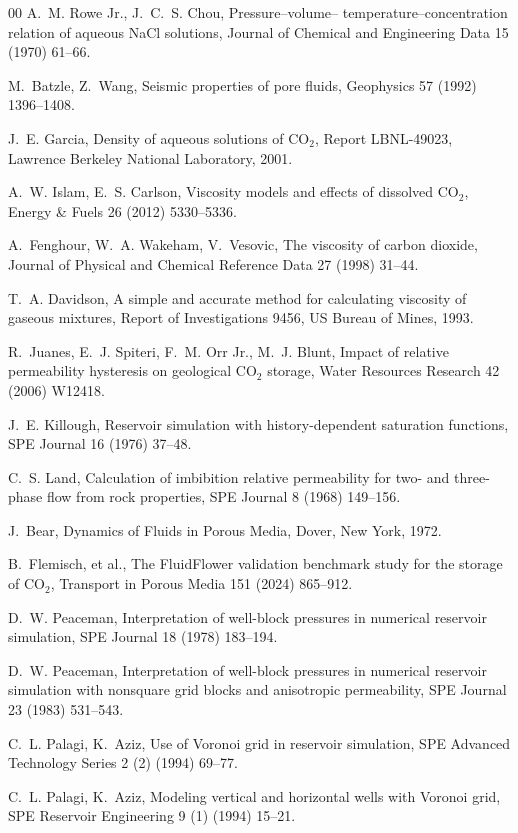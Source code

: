 \documentclass[preprint,11pt]{elsarticle}
\begin{document}
\begin{thebibliography}{00}
 A.~M. Rowe Jr., J.~C.~S. Chou, Pressure--volume--
temperature--concentration relation of aqueous NaCl solutions, Journal
of Chemical and Engineering Data 15 (1970) 61--66.

 M.~Batzle, Z.~Wang, Seismic properties of pore
fluids, Geophysics 57 (1992) 1396--1408.

 J.~E. Garcia, Density of aqueous solutions of
CO$_2$, Report LBNL-49023, Lawrence Berkeley National Laboratory, 2001.

 A.~W. Islam, E.~S. Carlson, Viscosity models and
effects of dissolved CO$_2$, Energy \& Fuels 26 (2012) 5330--5336.

 A.~Fenghour, W.~A. Wakeham, V.~Vesovic, The
viscosity of carbon dioxide, Journal of Physical and Chemical Reference
Data 27 (1998) 31--44.

 T.~A. Davidson, A simple and accurate method for
calculating viscosity of gaseous mixtures, Report of Investigations
9456, US Bureau of Mines, 1993.

 R.~Juanes, E.~J. Spiteri, F.~M. Orr Jr.,
M.~J. Blunt, Impact of relative permeability hysteresis on geological
CO$_2$ storage, Water Resources Research 42 (2006) W12418.

 J.~E. Killough, Reservoir simulation with
history-dependent saturation functions, SPE Journal 16 (1976) 37--48.

 C.~S. Land, Calculation of imbibition relative
permeability for two- and three-phase flow from rock properties, SPE
Journal 8 (1968) 149--156.

 J.~Bear, Dynamics of Fluids in Porous Media, Dover,
New York, 1972.

 B.~Flemisch, et al., The FluidFlower validation
benchmark study for the storage of CO$_2$, Transport in Porous Media 151
(2024) 865--912.

 D.~W. Peaceman, Interpretation of well-block
pressures in numerical reservoir simulation, SPE Journal 18 (1978)
183--194.

 D.~W. Peaceman, Interpretation of well-block
pressures in numerical reservoir simulation with nonsquare grid blocks
and anisotropic permeability, SPE Journal 23 (1983) 531--543.

 C.~L. Palagi, K.~Aziz, Use of Voronoi grid in
reservoir simulation, SPE Advanced Technology Series 2 (2) (1994) 69--77.

 C.~L. Palagi, K.~Aziz, Modeling vertical and
horizontal wells with Voronoi grid, SPE Reservoir Engineering 9 (1)
(1994) 15--21.

\end{thebibliography}
\end{document}
